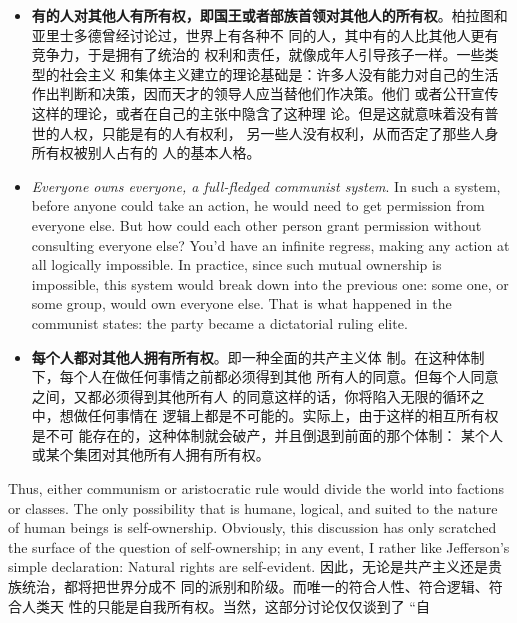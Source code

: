 \begin{paracol}{2}
\begin{itemize}
\end{itemize}
\switchcolumn
\begin{itemize}
	\item \textbf{有的人对其他人有所有权，即国王或者部族首领对其他人的所有权}。柏拉图和亚里士多德曾经讨论过，世界上有各种不
	同的人，其中有的人比其他人更有竞争力，于是拥有了统治的
	权利和责任，就像成年人引导孩子一样。一些类型的社会主义
	和集体主义建立的理论基础是：许多人没有能力对自己的生活
	作出判断和决策，因而天才的领导人应当替他们作决策。他们
	或者公幵宣传这样的理论，或者在自己的主张中隐含了这种理
	论。但是这就意味着没有普世的人权，只能是有的人有权利，
	另一些人没有权利，从而否定了那些人身所有权被别人占有的
	人的基本人格。
\end{itemize}
\switchcolumn*
\begin{itemize}
	\item \textit{Everyone owns everyone, a full-fledged communist system}. In such
	a system, before anyone could take an action, he would need to
	get permission from everyone else. But how could each other
	person grant permission without consulting everyone else?
	You'd have an infinite regress, making any action at all logically
	impossible. In practice, since such mutual ownership is impossible, this system would break down into the previous one: some one, or some group, would own everyone else. That is what
	happened in the communist states: the party became a dictatorial ruling elite.
\end{itemize}
\switchcolumn
\begin{itemize}
	\item \textbf{每个人都对其他人拥有所有权}。即一种全面的共产主义体
	制。在这种体制下，每个人在做任何事情之前都必须得到其他
	所有人的同意。但每个人同意之间，又都必须得到其他所有人
	的同意这样的话，你将陷入无限的循环之中，想做任何事情在
	逻辑上都是不可能的。实际上，由于这样的相互所有权是不可
	能存在的，这种体制就会破产，并且倒退到前面的那个体制：
	某个人或某个集团对其他所有人拥有所有权。
\end{itemize}
\switchcolumn*
Thus, either communism or aristocratic rule would divide the
world into factions or classes. The only possibility that is humane,
logical, and suited to the nature of human beings is self-ownership.
Obviously, this discussion has only scratched the surface of the
question of self-ownership; in any event, I rather like Jefferson's
simple declaration: Natural rights are self-evident.
\switchcolumn
因此，无论是共产主义还是贵族统治，都将把世界分成不
同的派别和阶级。而唯一的符合人性、符合逻辑、符合人类天
性的只能是自我所有权。当然，这部分讨论仅仅谈到了 “自

\end{paracol}

